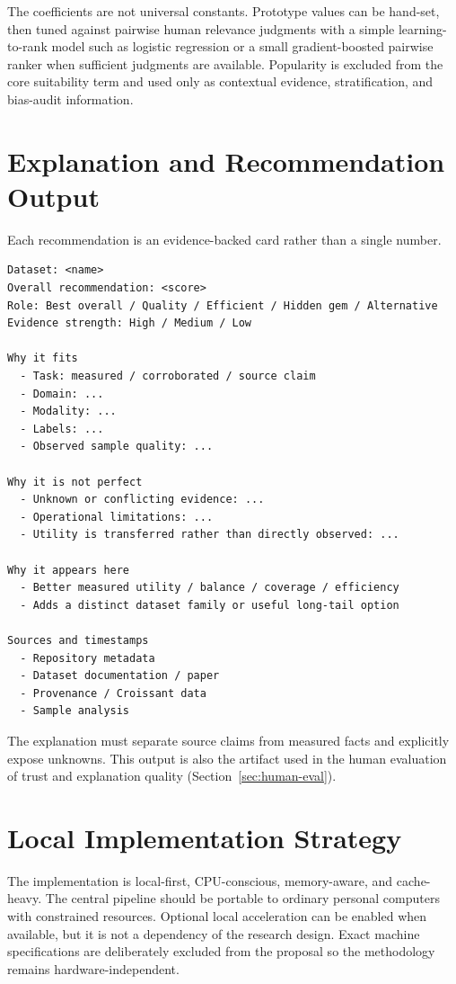 \documentclass[11pt]{article}
\begin{document}
The coefficients are not universal constants. Prototype values can be hand-set, then tuned against pairwise
human relevance judgments with a simple learning-to-rank model such as logistic regression or a small
gradient-boosted pairwise ranker when sufficient judgments are available. Popularity is excluded from the
core suitability term and used only as contextual evidence, stratification, and bias-audit information.

\section{Explanation and Recommendation Output}
Each recommendation is an evidence-backed card rather than a single number.

\begin{lstlisting}[basicstyle=\ttfamily\footnotesize]
Dataset: <name>
Overall recommendation: <score>
Role: Best overall / Quality / Efficient / Hidden gem / Alternative
Evidence strength: High / Medium / Low

Why it fits
  - Task: measured / corroborated / source claim
  - Domain: ...
  - Modality: ...
  - Labels: ...
  - Observed sample quality: ...

Why it is not perfect
  - Unknown or conflicting evidence: ...
  - Operational limitations: ...
  - Utility is transferred rather than directly observed: ...

Why it appears here
  - Better measured utility / balance / coverage / efficiency
  - Adds a distinct dataset family or useful long-tail option

Sources and timestamps
  - Repository metadata
  - Dataset documentation / paper
  - Provenance / Croissant data
  - Sample analysis
\end{lstlisting}

The explanation must separate source claims from measured facts and explicitly expose unknowns. This
output is also the artifact used in the human evaluation of trust and explanation quality
(Section~\ref{sec:human-eval}).

\section{Local Implementation Strategy}
The implementation is local-first, CPU-conscious, memory-aware, and cache-heavy. The central pipeline
should be portable to ordinary personal computers with constrained resources. Optional local acceleration
can be enabled when available, but it is not a dependency of the research design. Exact machine
specifications are deliberately excluded from the proposal so the methodology remains hardware-independent.
\end{document}
